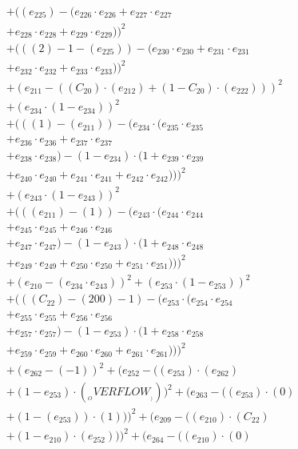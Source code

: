 \documentclass[10pt, a4paper]{article}
\begin{document}
\begin{align*}
& + ((e_{225}) - (e_{226} \cdot e_{226} + e_{227} \cdot e_{227} \\
& + e_{228} \cdot e_{228} + e_{229} \cdot e_{229}))^{2} \\
& + (((2) - 1 - (e_{225})) - (e_{230} \cdot e_{230} + e_{231} \cdot e_{231} \\
& + e_{232} \cdot e_{232} + e_{233} \cdot e_{233}))^{2} \\
& + (e_{211} - ((C_{20})  \cdot  (e_{212}) + (1 - C_{20})  \cdot  (e_{222})))^{2} \\
& + (e_{234} \cdot (1 - e_{234}))^{2} \\
& + (((1) - (e_{211})) - (e_{234} \cdot (e_{235} \cdot e_{235} \\
& + e_{236} \cdot e_{236} + e_{237} \cdot e_{237} \\
& + e_{238} \cdot e_{238}) - (1 - e_{234}) \cdot (1 + e_{239} \cdot e_{239} \\
& + e_{240} \cdot e_{240} + e_{241} \cdot e_{241} + e_{242} \cdot e_{242})))^{2} \\
& + (e_{243} \cdot (1 - e_{243}))^{2} \\
& + (((e_{211}) - (1)) - (e_{243} \cdot (e_{244} \cdot e_{244} \\
& + e_{245} \cdot e_{245} + e_{246} \cdot e_{246} \\
& + e_{247} \cdot e_{247}) - (1 - e_{243}) \cdot (1 + e_{248} \cdot e_{248} \\
& + e_{249} \cdot e_{249} + e_{250} \cdot e_{250} + e_{251} \cdot e_{251})))^{2} \\
& + (e_{210} - (e_{234} \cdot e_{243}))^{2} + (e_{253} \cdot (1 - e_{253}))^{2} \\
& + (((C_{22}) - (200) - 1) - (e_{253} \cdot (e_{254} \cdot e_{254} \\
& + e_{255} \cdot e_{255} + e_{256} \cdot e_{256} \\
& + e_{257} \cdot e_{257}) - (1 - e_{253}) \cdot (1 + e_{258} \cdot e_{258} \\
& + e_{259} \cdot e_{259} + e_{260} \cdot e_{260} + e_{261} \cdot e_{261})))^{2} \\
& + (e_{262} - (-1))^{2} + (e_{252} - ((e_{253})  \cdot  (e_{262}) \\
& + (1 - e_{253})  \cdot  (__OVERFLOW__)))^{2} + (e_{263} - ((e_{253}) \cdot (0) \\
& + (1 - (e_{253})) \cdot (1)))^{2} + (e_{209} - ((e_{210})  \cdot  (C_{22}) \\
& + (1 - e_{210})  \cdot  (e_{252})))^{2} + (e_{264} - ((e_{210}) \cdot (0) \\

\end{align*}
\end{document}
